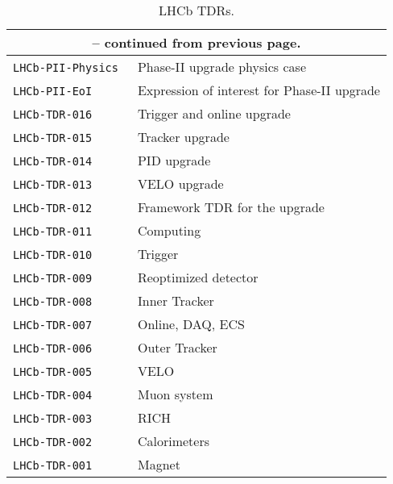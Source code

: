 \begin{center}
\begin{longtable}{ll}
\caption{\small LHCb TDRs.}\label{tab:LHCb-TDRs}
\endfirsthead
\multicolumn{2}{c}{ -- continued from previous page.}
\endhead
\endfoot
\endlastfoot
    \hline
    \texttt{LHCb-TDR} number & Title \\
    \hline
    \texttt{LHCb-PII-Physics}~\cite{LHCb-PII-Physics} &
    {\small  Phase-II upgrade physics case} \\
    \texttt{LHCb-PII-EoI}~\cite{LHCb-PII-EoI} &
    {\small Expression of interest for Phase-II upgrade} \\
    \texttt{LHCb-TDR-016}~\cite{LHCb-TDR-016} &
    {\small Trigger and online upgrade} \\
    \texttt{LHCb-TDR-015}~\cite{LHCb-TDR-015} &
    {\small Tracker upgrade} \\
    \texttt{LHCb-TDR-014}~\cite{LHCb-TDR-014} &
    {\small PID upgrade} \\
    \texttt{LHCb-TDR-013}~\cite{LHCb-TDR-013} &
    {\small VELO upgrade} \\
    \texttt{LHCb-TDR-012}~\cite{LHCb-TDR-012} &
    {\small Framework TDR for the upgrade} \\
    \texttt{LHCb-TDR-011}~\cite{LHCb-TDR-011} &
    {\small Computing} \\
    \texttt{LHCb-TDR-010}~\cite{LHCb-TDR-010} &
    {\small Trigger} \\
    \texttt{LHCb-TDR-009}~\cite{LHCb-TDR-009} &
    {\small Reoptimized detector} \\
    \texttt{LHCb-TDR-008}~\cite{LHCb-TDR-008} &
    {\small Inner Tracker} \\
    \texttt{LHCb-TDR-007}~\cite{LHCb-TDR-007} &
    {\small Online, DAQ, ECS} \\
    \texttt{LHCb-TDR-006}~\cite{LHCb-TDR-006} &
    {\small Outer Tracker} \\
    \texttt{LHCb-TDR-005}~\cite{LHCb-TDR-005} &
    {\small VELO} \\
    \texttt{LHCb-TDR-004}~\cite{LHCb-TDR-004} &
    {\small Muon system} \\
    \texttt{LHCb-TDR-003}~\cite{LHCb-TDR-003} &
    {\small RICH} \\
    \texttt{LHCb-TDR-002}~\cite{LHCb-TDR-002} &
    {\small Calorimeters} \\
    \texttt{LHCb-TDR-001}~\cite{LHCb-TDR-001} &
    {\small Magnet} \\
    \hline
  \end{longtable}
\end{center}

